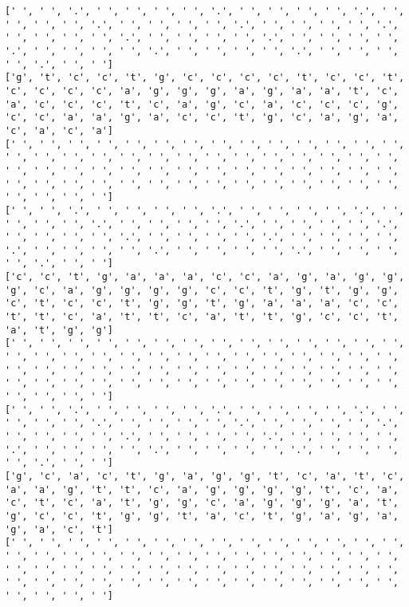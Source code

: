 \documentclass{article}
\begin{document}
\begin{Verbatim}
[' ', ' ', '.', ' ', ' ', ' ', ' ', '.', ' ', ' ', ' ', ' ', '.', ' ', ' ', ' ', ' ', '.', ' ', ' ', ' ', ' ', '.', ' ', ' ', ' ', ' ', '.', ' ', ' ', ' ', ' ', '.', ' ', ' ', ' ', ' ', '.', ' ', ' ', ' ', ' ', '.', ' ', ' ', ' ', ' ', '.', ' ', ' ', ' ', ' ', '.', ' ', ' ', ' ', ' ', '.', ' ', ' ']
['g', 't', 'c', 'c', 't', 'g', 'c', 'c', 'c', 'c', 't', 'c', 'c', 't', 'c', 'c', 'c', 'c', 'a', 'g', 'g', 'g', 'a', 'g', 'a', 'a', 't', 'c', 'a', 'c', 'c', 'c', 't', 'c', 'a', 'g', 'c', 'a', 'c', 'c', 'c', 'g', 'c', 'c', 'a', 'a', 'g', 'a', 'c', 'c', 't', 'g', 'c', 'a', 'g', 'a', 'c', 'a', 'c', 'a']
[' ', ' ', ' ', ' ', ' ', ' ', ' ', ' ', ' ', ' ', ' ', ' ', ' ', ' ', ' ', ' ', ' ', ' ', ' ', ' ', ' ', ' ', ' ', ' ', ' ', ' ', ' ', ' ', ' ', ' ', ' ', ' ', ' ', ' ', ' ', ' ', ' ', ' ', ' ', ' ', ' ', ' ', ' ', ' ', ' ', ' ', ' ', ' ', ' ', ' ', ' ', ' ', ' ', ' ', ' ', ' ', ' ', ' ', ' ', ' ']
[' ', ' ', '.', ' ', ' ', ' ', ' ', '.', ' ', ' ', ' ', ' ', '.', ' ', ' ', ' ', ' ', '.', ' ', ' ', ' ', ' ', '.', ' ', ' ', ' ', ' ', '.', ' ', ' ', ' ', ' ', '.', ' ', ' ', ' ', ' ', '.', ' ', ' ', ' ', ' ', '.', ' ', ' ', ' ', ' ', '.', ' ', ' ', ' ', ' ', '.', ' ', ' ', ' ', ' ', '.', ' ', ' ']
['c', 'c', 't', 'g', 'a', 'a', 'a', 'c', 'c', 'a', 'g', 'a', 'g', 'g', 'g', 'c', 'a', 'g', 'g', 'g', 'g', 'c', 'c', 't', 'g', 't', 'g', 'g', 'c', 't', 'c', 'c', 't', 'g', 'g', 't', 'g', 'a', 'a', 'a', 'c', 'c', 't', 't', 'c', 'a', 't', 't', 'c', 'a', 't', 't', 'g', 'c', 'c', 't', 'a', 't', 'g', 'g']
[' ', ' ', ' ', ' ', ' ', ' ', ' ', ' ', ' ', ' ', ' ', ' ', ' ', ' ', ' ', ' ', ' ', ' ', ' ', ' ', ' ', ' ', ' ', ' ', ' ', ' ', ' ', ' ', ' ', ' ', ' ', ' ', ' ', ' ', ' ', ' ', ' ', ' ', ' ', ' ', ' ', ' ', ' ', ' ', ' ', ' ', ' ', ' ', ' ', ' ', ' ', ' ', ' ', ' ', ' ', ' ', ' ', ' ', ' ', ' ']
[' ', ' ', '.', ' ', ' ', ' ', ' ', '.', ' ', ' ', ' ', ' ', '.', ' ', ' ', ' ', ' ', '.', ' ', ' ', ' ', ' ', '.', ' ', ' ', ' ', ' ', '.', ' ', ' ', ' ', ' ', '.', ' ', ' ', ' ', ' ', '.', ' ', ' ', ' ', ' ', '.', ' ', ' ', ' ', ' ', '.', ' ', ' ', ' ', ' ', '.', ' ', ' ', ' ', ' ', '.', ' ', ' ']
['g', 'c', 'a', 'c', 't', 'g', 'a', 'g', 'g', 't', 'c', 'a', 't', 'c', 'a', 'a', 'g', 't', 't', 'c', 'a', 'g', 'g', 'g', 'g', 't', 'c', 'a', 'c', 't', 'c', 'a', 't', 'g', 'g', 'c', 'a', 'g', 'g', 'g', 'a', 't', 'g', 'c', 'c', 't', 'g', 'g', 't', 'a', 'c', 't', 'g', 'a', 'g', 'a', 'g', 'a', 'c', 't']
[' ', ' ', ' ', ' ', ' ', ' ', ' ', ' ', ' ', ' ', ' ', ' ', ' ', ' ', ' ', ' ', ' ', ' ', ' ', ' ', ' ', ' ', ' ', ' ', ' ', ' ', ' ', ' ', ' ', ' ', ' ', ' ', ' ', ' ', ' ', ' ', ' ', ' ', ' ', ' ', ' ', ' ', ' ', ' ', ' ', ' ', ' ', ' ', ' ', ' ', ' ', ' ', ' ', ' ', ' ', ' ', ' ', ' ', ' ', ' ']

\end{Verbatim}
\end{document}
